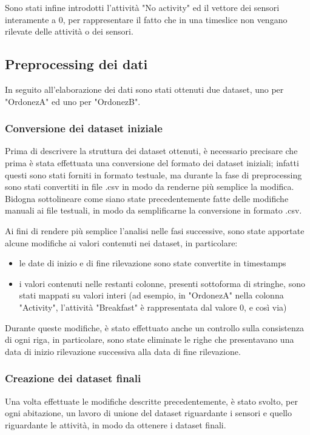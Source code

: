 \documentclass[10pt,a4paper]{article}
\begin{document}
	Sono stati infine introdotti l'attività "No activity" ed il vettore dei sensori interamente a 0, per rappresentare il fatto che in una timeslice non vengano rilevate delle attività o dei sensori.
	
	\subsection{Preprocessing dei dati}
	In seguito all'elaborazione dei dati sono stati ottenuti due dataset, uno per "OrdonezA" ed uno per "OrdonezB".
	\subsubsection{Conversione dei dataset iniziale}
	Prima di descrivere la struttura dei dataset ottenuti, è necessario precisare che prima è stata effettuata una conversione del formato dei dataset iniziali; infatti questi sono stati forniti in formato testuale, ma durante la fase di preprocessing sono stati convertiti in file .csv in modo da renderne più semplice la modifica. Bidogna sottolineare come siano state precedentemente fatte delle modifiche manuali ai file testuali, in modo da semplificarne la conversione in formato .csv.
	
	Ai fini di rendere più semplice l'analisi nelle fasi successive, sono state apportate alcune modifiche ai valori contenuti nei dataset, in particolare:
	\begin{itemize}
		\item le date di inizio e di fine rilevazione sono state convertite in timestamps
		\item i valori contenuti nelle restanti colonne, presenti sottoforma di stringhe, sono stati mappati su valori interi
		(ad esempio, in "OrdonezA" nella colonna "Activity", l'attività "Breakfast" è rappresentata dal valore 0, e così via)
	\end{itemize}
	
	Durante queste modifiche, è stato effettuato anche un controllo sulla consistenza di ogni riga, in particolare, sono state eliminate le righe che presentavano una data di inizio rilevazione successiva alla data di fine rilevazione.
	
	\subsubsection{Creazione dei dataset finali}
	Una volta effettuate le modifiche descritte precedentemente, è stato svolto, per ogni abitazione, un lavoro di unione del dataset riguardante i sensori e quello riguardante le attività, in modo da ottenere i dataset finali.
	
\end{document}
